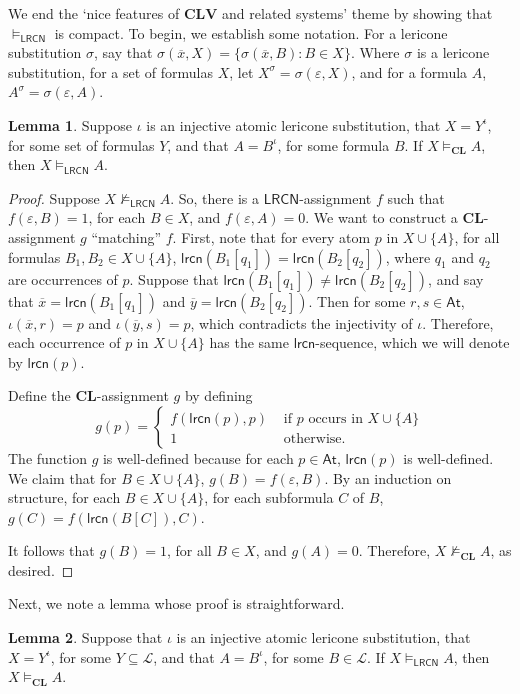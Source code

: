 \documentclass{amsart}
\theoremstyle{definition}
\newtheorem{lemma}{Lemma}
\newcommand{\LL}{\mathcal{L}}
\newcommand{\At}{\mathsf{At}}
\newcommand{\lrcn}{\mathsf{lrcn}}
\newcommand{\LRCN}{\mathsf{LRCN}}
\newcommand{\CLV}{\mathbf{CLV}}
\newcommand{\logic}[1]{{\ensuremath {\mathbf{#1}}}}
\newcommand{\set}[1]{\{#1\}}
\begin{document}
We end the `nice features of $\CLV$ and related systems' theme by showing that $\vDash_{\LRCN}$ is compact. 
To begin, we establish some notation. 
For a lericone substitution $\sigma$, say that $\sigma(\overline{x},X)=\set{\sigma(\overline{x},B):B\in X}$. 
Where $\sigma$ is a lericone substitution, for a set of formulas $X$, let $X^\sigma=\sigma(\varepsilon,X)$, and for a formula $A$, $A^\sigma=\sigma(\varepsilon,A)$. 
\begin{lemma}
Suppose $\iota$ is an injective atomic lericone substitution, that $X=Y^\iota$, for some set of formulas $Y$, and that $A=B^\iota$, for some formula $B$.
If $X\vDash_{\logic{CL}}A$, then $X\vDash_{\LRCN} A$. 
\end{lemma}
\begin{proof}
Suppose $X\not\vDash_{\LRCN} A$. So, there is a $\LRCN$-assignment $f$ such that $f(\varepsilon, B)=1$, for each $B\in X$, and $f(\varepsilon,A)=0$. 
We want to construct a \logic{CL}-assignment $g$ ``matching'' $f$. 
First, note that for every atom $p$ in $X\cup\set{A}$, for all formulas $B_1,B_2\in X\cup\set{A}$, $\lrcn(B_1[q_1])=\lrcn(B_2[q_2])$, where $q_1$ and $q_2$ are occurrences of $p$. 
Suppose that $\lrcn(B_1[q_1])\neq\lrcn(B_2[q_2])$, and say that $\overline{x}=\lrcn(B_1[q_1])$ and $\overline{y}=\lrcn(B_2[q_2])$. 
Then for some $r,s\in\At$, $\iota(\overline{x},r)=p$ and $\iota(\overline{y},s)=p$, which contradicts the injectivity of $\iota$. 
Therefore, each occurrence of $p$ in $X\cup\set{A}$ has the same $\lrcn$-sequence, which we will denote by $\lrcn(p)$. 

Define the $\logic{CL}$-assignment $g$ by defining 
\[
g(p)=\left\{
        \begin{array}{rl}
            f(\lrcn(p), p) & \text{ if } p \text{ occurs in $X\cup\set{A}$}  \\
            1 & \text{ otherwise}.
        \end{array}\right.
\]
The function $g$ is well-defined because for each $p\in \At$, $\lrcn(p)$ is well-defined.
We claim that for $B\in X\cup\set{A}$, $g(B)=f(\varepsilon, B)$. 
By an induction on structure, for each $B\in X\cup\set{A}$, for each subformula $C$ of $B$, $g(C)=f(\lrcn(B[C]), C)$. 

It follows that $g(B)=1$, for all $B\in X$, and $g(A)=0$. Therefore, $X\not\vDash_{\logic{CL}}A$, as desired.
\end{proof}
Next, we note a lemma whose proof is straightforward. 
\begin{lemma}
    Suppose that $\iota$ is an injective atomic lericone substitution, that $X=Y^\iota$, for some $Y\subseteq \LL$, and that $A=B^\iota$, for some $B\in\LL$.
If $X\vDash_{\LRCN}A$, then $X\vDash_{\logic{CL}} A$. 
\end{lemma}
\end{document}
